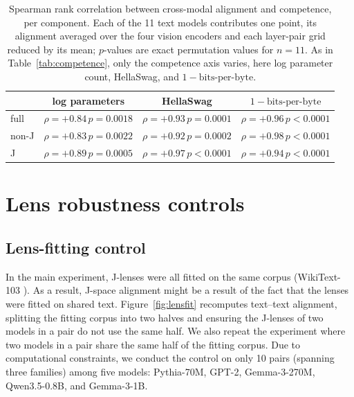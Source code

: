\documentclass{article}
\begin{document}
\begin{table}[h]
  \centering
  \small
  \caption{Spearman rank correlation between cross-modal alignment and
    competence, per component. Each of the 11 text models contributes one point,
    its alignment averaged over the four vision encoders and each layer-pair
    grid reduced by its mean; $p$-values are exact permutation values for
    $n=11$. As in Table~\ref{tab:competence},
    only the competence axis varies, here log parameter count, HellaSwag, and
    $1 - \mathrm{bits\text{-}per\text{-}byte}$.}
  \label{tab:crossaxes}
  \begin{tabular}{lccc}
    \toprule
         & log parameters                       & HellaSwag                            & $1 - \mathrm{bits\text{-}per\text{-}byte}$                    \\
    \midrule
    full & $\rho = +0.84$\,{\tiny$p = 0.0018$} & $\rho = +0.93$\,{\tiny$p = 0.0001$} & $\rho = +0.96$\,{\tiny$p < 0.0001$} \\
    non-J & $\rho = +0.83$\,{\tiny$p = 0.0022$} & $\rho = +0.92$\,{\tiny$p = 0.0002$} & $\rho = +0.98$\,{\tiny$p < 0.0001$} \\
    J    & $\rho = +0.89$\,{\tiny$p = 0.0005$} & $\rho = +0.97$\,{\tiny$p < 0.0001$} & $\rho = +0.94$\,{\tiny$p < 0.0001$} \\
    \bottomrule
  \end{tabular}
\end{table}
\section{Lens robustness controls}
\subsection{Lens-fitting control}
\label{app:lensfit}
In the main experiment, J-lenses were all fitted on the same corpus (WikiText-103 \citet{merity2016pointer}). As a result, J-space alignment might be a result of the fact that the lenses were fitted on shared text. Figure~\ref{fig:lensfit} recomputes text--text alignment, splitting the fitting corpus into two halves and ensuring the J-lenses of two models in a pair do not use the same half. We also repeat the experiment where two models in a pair share the same half of the fitting corpus. Due to computational constraints, we conduct the control on only 10 pairs (spanning three families) among five models: Pythia-70M, GPT-2, Gemma-3-270M, Qwen3.5-0.8B, and Gemma-3-1B.
\end{document}
